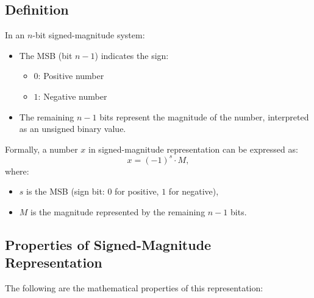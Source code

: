 \subsection{Definition}
In an \( n \)-bit signed-magnitude system:
\begin{itemize}
    \item The MSB (bit \( n-1 \)) indicates the sign:
    \begin{itemize}[label={}]
        \item \( 0 \): Positive number
        \item \( 1 \): Negative number
    \end{itemize}
    \item The remaining \( n-1 \) bits represent the magnitude of the number, interpreted as an unsigned binary value.
\end{itemize}

Formally, a number \( x \) in signed-magnitude representation can be expressed as:
\[
x = (-1)^{s} \cdot M,
\]
where:
\begin{itemize}
    \item \( s \) is the MSB (sign bit: \( 0 \) for positive, \( 1 \) for negative),
    \item \( M \) is the magnitude represented by the remaining \( n-1 \) bits.
\end{itemize}



\subsection{Properties of Signed-Magnitude Representation}
The following are the mathematical properties of this representation:

